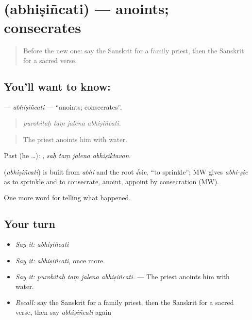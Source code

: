 \section[\texorpdfstring{\sk{अभिषिञ्चति} (abhiṣiñcati)}{अभिषिञ्चति (abhiṣiñcati)}]{ (abhiṣiñcati) — anoints; consecrates}

\label{lesson:SA-C321-abhisincati}



\begin{quote}
Before the new one: say the Sanskrit for a family priest, then the Sanskrit for a sacred verse.
\end{quote}

\subsection*{You'll want to know: }
\textbf{} — \emph{abhiṣiñcati} — \textquotedblleft{}anoints; consecrates\textquotedblright{}.

\begin{quote}
   
\end{quote}

\begin{quote}
\emph{purohitaḥ taṃ jalena abhiṣiñcati.}
\end{quote}

\begin{quote}
The priest anoints him with water.
\end{quote}

Past (he …):    , \emph{saḥ taṃ jalena abhiṣiktavān}.

\begin{cousinweb}
\textbf{} (\emph{abhiṣiñcati}) is built from \emph{abhi} and the root √sic, \textquotedblleft{}to sprinkle\textquotedblright{}; MW gives \emph{abhi-ṣic} as to sprinkle and to consecrate, anoint, appoint by consecration (MW).
\end{cousinweb}

\begin{grammarlens}[title={What you've built}]
One more word for telling what happened.
\end{grammarlens}

\subsection*{Your turn}
\begin{itemize}
\raggedright
  \item \emph{Say it:} \emph{abhiṣiñcati}
  \item \emph{Say it:} \emph{abhiṣiñcati}, once more
  \item \emph{Say it:} \emph{purohitaḥ taṃ jalena abhiṣiñcati.} — The priest anoints him with water.
  \item \emph{Recall:} say the Sanskrit for a family priest, then the Sanskrit for a sacred verse, then say \emph{abhiṣiñcati} again
\end{itemize}

